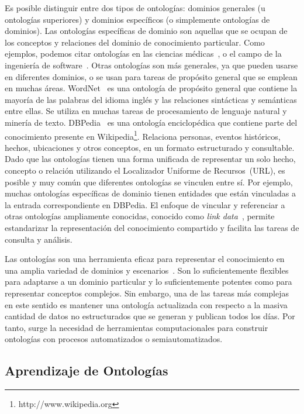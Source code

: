 Es posible distinguir entre dos tipos de ontologías: dominios generales (u ontologías superiores) y dominios específicos (o simplemente ontologías de dominios). Las ontologías específicas de dominio son aquellas que se ocupan de los conceptos y relaciones del dominio de conocimiento particular.
Como ejemplos, podemos citar ontologías en las ciencias médicas~\cite{rector2003opengalen, gene2004gene}, o el campo de la ingeniería de software~\cite{4641930}.
Otras ontologías son más generales, ya que pueden usarse en diferentes dominios, o se usan para tareas de propósito general que se emplean en muchas áreas. WordNet~\cite{miller1995wordnet} es una ontología de propósito general que contiene la mayoría de las palabras del idioma inglés y las relaciones sintácticas y semánticas entre ellas.
Se utiliza en muchas tareas de procesamiento de lenguaje natural y minería de texto.
DBPedia~\cite{mendes2012dbpedia} es una ontología enciclopédica que contiene parte del conocimiento presente en Wikipedia\footnote{http://www.wikipedia.org}.
Relaciona personas, eventos históricos, hechos, ubicaciones y otros conceptos, en un formato estructurado y consultable. Dado que las ontologías tienen una forma unificada de representar un solo hecho, concepto o relación utilizando el Localizador Uniforme de Recursos~(URL), es posible y muy común que diferentes ontologías se vinculen entre sí.
Por ejemplo, muchas ontologías específicas de dominio tienen entidades que están vinculadas a la entrada correspondiente en DBPedia.
El enfoque de vincular y referenciar a otras ontologías ampliamente conocidas, conocido como \textit{link data}~\cite{bizer2009linked}, permite estandarizar la representación del conocimiento compartido y facilita las tareas de consulta y análisis.

Las ontologías son una herramienta eficaz para representar el conocimiento en una amplia variedad de dominios y escenarios~\cite{staab2010handbook}.
Son lo suficientemente flexibles para adaptarse a un dominio particular y lo suficientemente potentes como para representar conceptos complejos.
Sin embargo, una de las tareas más complejas en este sentido es mantener una ontología actualizada con respecto a la masiva cantidad de datos no estructurados que se generan y publican todos los días.
Por tanto, surge la necesidad de herramientas computacionales para construir ontologías con procesos automatizados o semiautomatizados.

\subsection{Aprendizaje de Ontologías}

